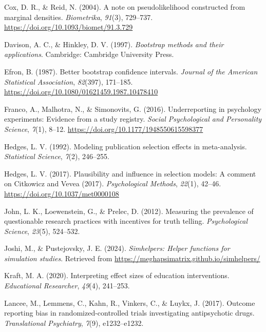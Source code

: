 \documentclass[
  american,
  man, donotrepeattitle,floatsintext]{apa7}
\newlength{\cslhangindent}
\newenvironment{CSLReferences}[2] %
 {\begin{list}{}{%
  \setlength{\itemindent}{0pt}
  \setlength{\leftmargin}{0pt}
  \setlength{\parsep}{0pt}
  \ifodd #1
   \setlength{\leftmargin}{\cslhangindent}
   \setlength{\itemindent}{-1\cslhangindent}
  \fi
  \setlength{\itemsep}{#2\baselineskip}}}
 {\end{list}}
\begin{document}
\begin{CSLReferences}{1}{0}
Cox, D. R., \& Reid, N. (2004). A note on pseudolikelihood constructed from marginal densities. \emph{Biometrika}, \emph{91}(3), 729--737. \url{https://doi.org/10.1093/biomet/91.3.729}

Davison, A. C., \& Hinkley, D. V. (1997). \emph{Bootstrap methods and their applications}. Cambridge: Cambridge University Press.

Efron, B. (1987). Better bootstrap confidence intervals. \emph{Journal of the American Statistical Association}, \emph{82}(397), 171--185. \url{https://doi.org/10.1080/01621459.1987.10478410}

Franco, A., Malhotra, N., \& Simonovits, G. (2016). Underreporting in psychology experiments: Evidence from a study registry. \emph{Social Psychological and Personality Science}, \emph{7}(1), 8--12. \url{https://doi.org/10.1177/1948550615598377}

Hedges, L. V. (1992). Modeling publication selection effects in meta-analysis. \emph{Statistical Science}, \emph{7}(2), 246--255.

Hedges, L. V. (2017). Plausibility and influence in selection models: {A} comment on {Citkowicz} and {Vevea} (2017). \emph{Psychological Methods}, \emph{22}(1), 42--46. \url{https://doi.org/10.1037/met0000108}

John, L. K., Loewenstein, G., \& Prelec, D. (2012). Measuring the prevalence of questionable research practices with incentives for truth telling. \emph{Psychological Science}, \emph{23}(5), 524--532.

Joshi, M., \& Pustejovsky, J. E. (2024). \emph{Simhelpers: Helper functions for simulation studies}. Retrieved from \url{https://meghapsimatrix.github.io/simhelpers/}

Kraft, M. A. (2020). Interpreting effect sizes of education interventions. \emph{Educational Researcher}, \emph{49}(4), 241--253.

Lancee, M., Lemmens, C., Kahn, R., Vinkers, C., \& Luykx, J. (2017). Outcome reporting bias in randomized-controlled trials investigating antipsychotic drugs. \emph{Translational Psychiatry}, \emph{7}(9), e1232--e1232.


\end{CSLReferences}
\end{document}
